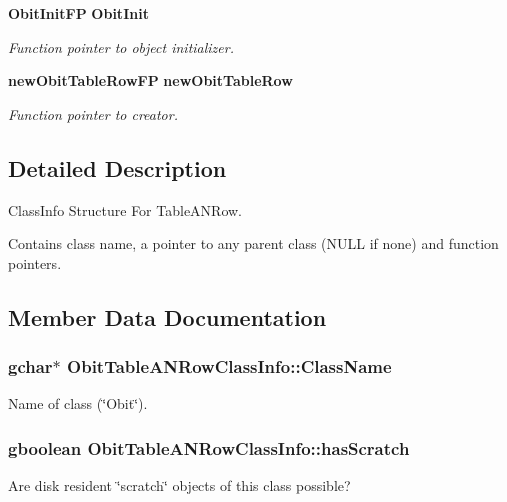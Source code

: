 \begin{CompactItemize}
{\bf Obit\-Init\-FP} {\bf Obit\-Init}
\begin{CompactList}\small\item\em Function pointer to object initializer. \item\end{CompactList}\item 
{\bf new\-Obit\-Table\-Row\-FP} {\bf new\-Obit\-Table\-Row}
\begin{CompactList}\small\item\em Function pointer to creator. \item\end{CompactList}\end{CompactItemize}


\subsection{Detailed Description}
Class\-Info Structure For Table\-ANRow. 

Contains class name, a pointer to any parent class (NULL if none) and function pointers. 



\subsection{Member Data Documentation}
\subsubsection{\setlength{\rightskip}{0pt plus 5cm}gchar$\ast$ {\bf Obit\-Table\-ANRow\-Class\-Info::Class\-Name}}\label{structObitTableANRowClassInfo_o2}


Name of class (\char`\"{}Obit\char`\"{}). 

\subsubsection{\setlength{\rightskip}{0pt plus 5cm}gboolean {\bf Obit\-Table\-ANRow\-Class\-Info::has\-Scratch}}\label{structObitTableANRowClassInfo_o1}


Are disk resident \char`\"{}scratch\char`\"{} objects of this class possible? 


